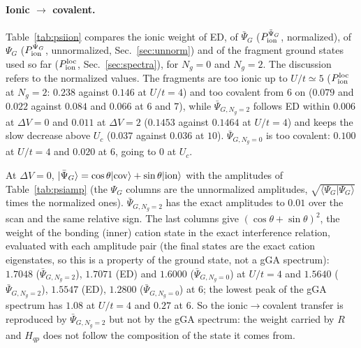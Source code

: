 \documentclass[11pt]{article}
\newcommand{\Ng}{N_{g}}
\newcommand{\dV}{\Delta V}
\begin{document}
\paragraph{Ionic $\to$ covalent.} Table~\ref{tab:psiion} compares the ionic weight of ED, of $\bar\Psi_G$ ($P_{\rm ion}^{\bar\Psi_G}$, normalized), of $\Psi_G$ ($P_{\rm ion}^{\Psi_G}$, unnormalized, Sec.~\ref{sec:unnorm}) and of the fragment ground states used so far ($P_{\rm ion}^{\rm loc}$, Sec.~\ref{sec:spectra}), for $\Ng=0$ and $\Ng=2$. The discussion refers to the normalized values. The fragments are too ionic up to $U/t\simeq5$ ($P_{\rm ion}^{\rm loc}$ at $\Ng=2$: $0.238$ against $0.146$ at $U/t=4$) and too covalent from $6$ on ($0.079$ and $0.022$ against $0.084$ and $0.066$ at $6$ and $7$), while $\bar\Psi_{G,\Ng=2}$ follows ED within $0.006$ at $\dV=0$ and $0.011$ at $\dV=2$ ($0.1453$ against $0.1464$ at $U/t=4$) and keeps the slow decrease above $U_c$ ($0.037$ against $0.036$ at $10$). $\bar\Psi_{G,\Ng=0}$ is too covalent: $0.100$ at $U/t=4$ and $0.020$ at $6$, going to $0$ at $U_c$.
\begin{table}[H]
\centering\small

\caption{Ionic weight: ED, $P_{\rm ion}^{\bar\Psi_G}$ of the normalized $\bar\Psi_{G,\Ng=0}$, $\bar\Psi_{G,\Ng=2}$ and $P_{\rm ion}^{\Psi_G}$ of the unnormalized $\Psi_{G,\Ng=0}$, $\Psi_{G,\Ng=2}$ (computed directly with $\Psi_G$; not a probability), and $P_{\rm ion}^{\rm loc}$ of the fragment ground states (loc). --: not shown, $\Psi_G$ is not determined above $U_c$ of $\Ng=0$ ($\Psi_{\rm qp}$ not fixed by the solution).}
\label{tab:psiion}
\end{table}
At $\dV=0$, $|\bar\Psi_G\rangle=\cos\theta|{\rm cov}\rangle+\sin\theta|{\rm ion}\rangle$ with the amplitudes of Table~\ref{tab:psiamp} (the $\Psi_G$ columns are the unnormalized amplitudes, $\sqrt{\langle\Psi_G|\Psi_G\rangle}$ times the normalized ones). $\bar\Psi_{G,\Ng=2}$ has the exact amplitudes to $0.01$ over the scan and the same relative sign. The last columns give $(\cos\theta+\sin\theta)^2$, the weight of the bonding (inner) cation state in the exact interference relation, evaluated with each amplitude pair (the final states are the exact cation eigenstates, so this is a property of the ground state, not a gGA spectrum): $1.7048$ ($\bar\Psi_{G,\Ng=2}$), $1.7071$ (ED) and $1.6000$ ($\bar\Psi_{G,\Ng=0}$) at $U/t=4$ and $1.5640$ ($\bar\Psi_{G,\Ng=2}$), $1.5547$ (ED), $1.2800$ ($\bar\Psi_{G,\Ng=0}$) at $6$; the lowest peak of the gGA spectrum has $1.08$ at $U/t=4$ and $0.27$ at $6$.
So the ionic$\to$covalent transfer is reproduced by $\bar\Psi_{G,\Ng=2}$ but not by the gGA spectrum: the weight carried by $R$ and $H_{qp}$ does not follow the composition of the state it comes from.
\end{document}

